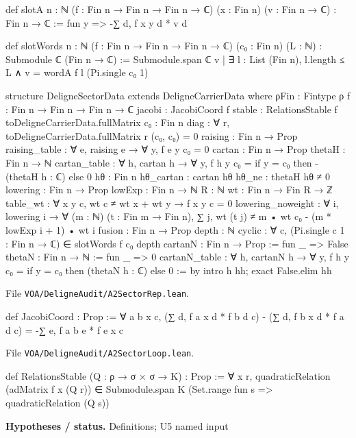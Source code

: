 \documentclass[11pt,openany]{book}
\newcommand{\leanpath}[1]{\texttt{\small #1}}
\theoremstyle{definition}
\theoremstyle{plain}
\begin{document}
\begin{leancode}
def slotA {n : ℕ} (f : Fin n → Fin n → Fin n → ℂ) (x : Fin n) (v : Fin n → ℂ) : Fin n → ℂ :=
  fun y => -∑ d, f x y d * v d

def slotWords {n : ℕ} (f : Fin n → Fin n → Fin n → ℂ) (c₀ : Fin n) (L : ℕ) :
    Submodule ℂ (Fin n → ℂ) :=
  Submodule.span ℂ {v | ∃ l : List (Fin n), l.length ≤ L ∧ v = wordA f l (Pi.single c₀ 1)}

structure DeligneSectorData extends DeligneCarrierData where
  ρFin : Fintype ρ
  f : Fin n → Fin n → Fin n → ℂ
  jacobi : JacobiCoord f
  stable : RelationsStable f toDeligneCarrierData.fullMatrix
  c₀ : Fin n
  diag : ∀ r, toDeligneCarrierData.fullMatrix r (c₀, c₀) = 0
  raising : Fin n → Prop
  raising_table : ∀ e, raising e → ∀ y, f e y c₀ = 0
  cartan : Fin n → Prop
  thetaH : Fin n → ℕ
  cartan_table : ∀ h, cartan h → ∀ y, f h y c₀ = if y = c₀ then -(thetaH h : ℂ) else 0
  hθ : Fin n
  hθ_cartan : cartan hθ
  hθ_ne : thetaH hθ ≠ 0
  lowering : Fin n → Prop
  lowExp : Fin n → ℕ
  R : ℕ
  wt : Fin n → Fin R → ℤ
  table_wt : ∀ x y c, wt c ≠ wt x + wt y → f x y c = 0
  lowering_noweight : ∀ i, lowering i → ∀ (m : ℕ) (t : Fin m → Fin n),
    ∑ j, wt (t j) ≠ m • wt c₀ - (m * lowExp i + 1) • wt i
  fusion : Fin n → Prop
  depth : ℕ
  cyclic : ∀ c, (Pi.single c 1 : Fin n → ℂ) ∈ slotWords f c₀ depth
  cartanN : Fin n → Prop := fun _ => False
  thetaN : Fin n → ℕ := fun _ => 0
  cartanN_table : ∀ h, cartanN h → ∀ y, f h y c₀ = if y = c₀ then (thetaN h : ℂ) else 0 := by
    intro h hh; exact False.elim hh
\end{leancode}
{\raggedright\noindent File \leanpath{VOA/\allowbreak DeligneAudit/\allowbreak A2SectorRep.lean}.\par}
\begin{leancode}
def JacobiCoord : Prop :=
  ∀ a b x c, (∑ d, f a x d * f b d c) - (∑ d, f b x d * f a d c) = -∑ e, f a b e * f e x c
\end{leancode}
{\raggedright\noindent File \leanpath{VOA/\allowbreak DeligneAudit/\allowbreak A2SectorLoop.lean}.\par}
\begin{leancode}
def RelationsStable (Q : ρ → σ × σ → K) : Prop :=
  ∀ x r, quadraticRelation (adMatrix f x (Q r)) ∈
    Submodule.span K (Set.range fun s => quadraticRelation (Q s))
\end{leancode}
\noindent\textbf{Hypotheses / status.} Definitions; U5 named input\par
\medskip
\end{document}
